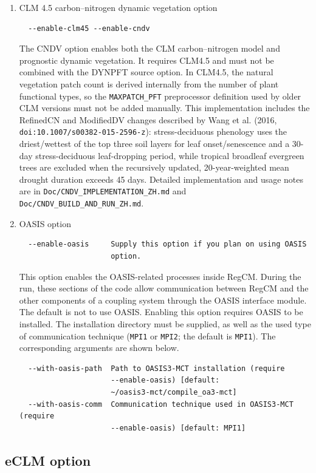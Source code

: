 \begin{enumerate}
is to use the RegCM BATS Land Model, but ICTP is strongly suggesting this as
the default surface model option to be used on CORDEX projects,
\item CLM 4.5 carbon--nitrogen dynamic vegetation option
\begin{Verbatim}
  --enable-clm45 --enable-cndv
\end{Verbatim}
The CNDV option enables both the CLM carbon--nitrogen model and prognostic
dynamic vegetation. It requires CLM4.5 and must not be combined with the
DYNPFT source option. In CLM4.5, the natural vegetation patch count is derived
internally from the number of plant functional types, so the
\verb=MAXPATCH_PFT= preprocessor definition used by older CLM versions must
not be added manually. This implementation includes the RefinedCN and
ModifiedDV changes described by Wang et al. (2016,
\verb=doi:10.1007/s00382-015-2596-z=): stress-deciduous phenology uses the
driest/wettest of the top three soil layers for leaf onset/senescence and a
30-day stress-deciduous leaf-dropping period, while tropical broadleaf
evergreen trees are excluded when the recursively updated, 20-year-weighted
mean drought duration exceeds 45 days. Detailed implementation and usage
notes are in \verb=Doc/CNDV_IMPLEMENTATION_ZH.md= and
\verb=Doc/CNDV_BUILD_AND_RUN_ZH.md=.
\item OASIS option
\begin{verbatim}
  --enable-oasis     Supply this option if you plan on using OASIS
                     option.
\end{verbatim}
This option enables the OASIS-related processes inside RegCM. During the run,
these sections of the code allow communication between RegCM and the other
components of a coupling system through the OASIS interface module. The default
is not to use OASIS.
Enabling this option requires OASIS to be installed. The installation directory
must be supplied, as well as the used type of communication technique
(\verb=MPI1= or \verb=MPI2=; the default is \verb=MPI1=).
The corresponding arguments are shown below.
\begin{verbatim}
  --with-oasis-path  Path to OASIS3-MCT installation (require
                     --enable-oasis) [default:
                     ~/oasis3-mct/compile_oa3-mct]
  --with-oasis-comm  Communication technique used in OASIS3-MCT (require
                     --enable-oasis) [default: MPI1]
\end{verbatim}
\end{enumerate}

\subsection{eCLM option}


